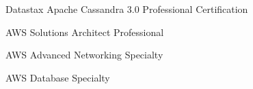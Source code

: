 



\begin{cvhonors}


\cvhonor
{Datastax} %
{Apache Cassandra 3.0 Professional Certification} %
{} %
{} %



\end{cvhonors}




\begin{cvhonors}


\cvhonor
{AWS Solutions Architect} %
{Professional} %
{} %
{} %


\cvhonor
{AWS Advanced Networking} %
{Specialty} %
{} %
{} %


\cvhonor
{AWS Database} %
{Specialty} %
{} %
{} %


\end{cvhonors}